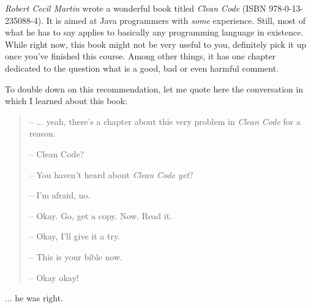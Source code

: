 \begin{hintbox}
\emph{Robert Cecil Martin} wrote a wonderful book titled \emph{Clean Code} (ISBN 978-0-13-235088-4). It is aimed at Java programmers with \emph{some} experience. Still, most of what he has to say applies to basically any programming language in existence. While right now, this book might not be very useful to you, definitely pick it up once you've finished this course. Among other things, it has one chapter dedicated to the question what is a good, bad or even harmful comment.

To double down on this recommendation, let me quote here the conversation in which I learned about this book:
\vspace{-6pt}
\begin{quote}
\hspace{-2pt}-- ... yeah, there's a chapter about this very problem in \emph{Clean Code} for a reason.

-- Clean Code?

-- You haven't heard about \emph{Clean Code yet}?

-- I'm afraid, no.

-- Okay. Go, get a copy. Now. Read it.

-- Okay, I'll give it a try.

-- This is your bible now.

-- Okay okay!
\end{quote}

... he was right.
\end{hintbox}

